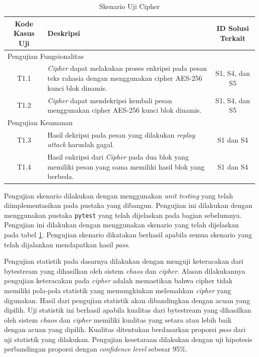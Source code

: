 \begin{table}[!h]
  \centering
  \caption{Skenario Uji Cipher} \label{tab:test.case.cipher}
  \begin{tabular}{|c|p{7cm}|c|}
    \hline
    \textbf{Kode Kasus Uji} & \textbf{Deskripsi} & \textbf{ID Solusi Terkait} \\ \hline
    \multicolumn{3}{|l|}{Pengujian Fungsionalitas} \\ \hline
    T1.1 & \emph{Cipher} dapat melakukan proses enkripsi pada pesan teks rahasia dengan menggunakan cipher AES-256 kunci blok dinamis.  & S1, S4, dan S5\\ \hline
    T1.2 & \emph{Cipher} dapat mendekripsi kembali pesan menggunakan cipher AES-256 kunci blok dinamis. & S1, S4, dan S5\\ \hline
    \multicolumn{3}{|l|}{Pengujian Keamanan} \\ \hline
    T1.3 & Hasil dekripsi pada pesan yang dilakukan \emph{replay attack} haruslah gagal. & S1 dan S4\\ \hline
    T1.4 & Hasil enkripsi dari \emph{Cipher} pada dua blok yang memiliki pesan yang sama memiliki hasil blok yang berbeda. & S1 dan S4\\ \hline
  \end{tabular}
\end{table}

Pengujian skenario dilakukan dengan menggunakan \emph{unit testing} yang telah diimplementasikan pada pustaka yang dibangun. Pengujian ini dilakukan dengan menggunakan pustaka \texttt{pytest} yang telah dijelaskan pada bagian sebelumnya. Pengujian ini dilakukan dengan menggunakan skenario yang telah dijelaskan pada tabel \ref{tab:test.case.cipher}. Pengujian skenario dikatakan berhasil apabila semua skenario yang telah dijalankan mendapatkan hasil \emph{pass}.

Pengujian statistik pada dasarnya dilakukan dengan menguji keteracakan dari bytestream yang dihasilkan oleh sistem \emph{chaos} dan \emph{cipher}. Alasan dilakukannya pengujian keteracakan pada \emph{cipher} adalah memastikan bahwa cipher tidak memiliki pola-pola statistik yang memungkinkan melemahkan \emph{cipher} yang digunakan. Hasil dari pengujian statistik akan dibandingkan dengan acuan yang dipilih. Uji statistik ini berhasil apabila kualitas dari bytestream yang dihasilkan oleh sistem \emph{chaos} dan \emph{cipher} memiliki kualitas yang setara atau lebih baik dengan acuan yang dipilih. Kualitas ditentukan berdasarkan proporsi \emph{pass} dari uji statistik yang dilakukan. Pengujian kesetaraan dilakukan dengan uji hipotesis perbandingan proporsi dengan \emph{confidence level} sebesar 95\%.

